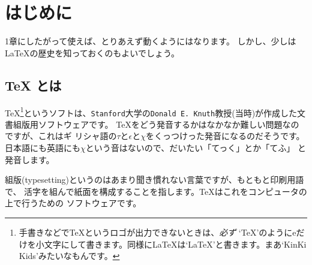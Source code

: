 
\section{はじめに}
1章にしたがって使えば、とりあえず動くようにはなります。
しかし、少しは{\LaTeX}の歴史を知っておくのもよいでしょう。

\subsection{{\TeX} とは}
{\TeX}\footnote{手書きなどで{\TeX}というロゴが出力できないときは、\emph{必ず} `TeX'のようにeだけを小文字にして書きます。同様に{\LaTeX}は`LaTeX'と書きます。まあ`KinKi Kids'みたいなもんです。}というソフトは、\verb+Stanford+大学の\verb+Donald E. Knuth+教授(当時)が作成した文書組版用ソフトウェアです。
{\TeX}をどう発音するかはなかなか難しい問題なのですが、これはギ
リシャ語の$\tau$と$\epsilon$と$\chi$をくっつけった発音になるのだそうです。
日本語にも英語にも$\chi$という音はないので、だいたい「てっく」とか「てふ」
と発音します。

組版(typesetting)というのはあまり聞き慣れない言葉ですが、もともと印刷用語で、
活字を組んで紙面を構成することを指します。{\TeX}はこれをコンピュータの上で行うための
ソフトウェアです。

